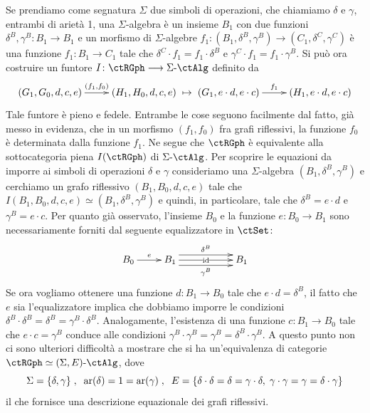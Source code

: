 \begin{example}
 Se prendiamo come segnatura \(\Sigma\) due simboli di operazioni, che chiamiamo \(\delta\) e \(\gamma\), entrambi di arietà 1,
 una \(\Sigma\)-algebra è un insieme \(B_1\) con due funzioni \(\delta^B, \gamma^B \colon B_1 \to B_1\) e un morfismo
 di \(\Sigma\)-algebre \(f_1 \colon (B_1,\delta^B,\gamma^B) \to (C_1,\delta^C,\gamma^C)\) è una funzione \(f_1 \colon B_1 \to C_1\)
 tale che \(\delta^C \cdot f_1 = f_1 \cdot \delta^B\) e \(\gamma^C \cdot f_1 = f_1 \cdot \gamma^B\). Si può ora costruire un
 funtore \(I \colon \ctRGph \fun \ctSAlg\) definito da
 \[\xymatrix{(G_1,G_0,d,c,e) \ar[r]^-{(f_1,f_0)} & (H_1,H_0,d,c,e)} \mapsto
  \xymatrix{(G_1, e \cdot d, e \cdot c) \ar[r]^-{f_1} & (H_1, e \cdot d, e \cdot c)}\]
 Tale funtore è pieno e fedele. Entrambe le cose seguono facilmente dal fatto, già messo in evidenza, che in un morfismo \((f_1,f_0)\)
 fra grafi riflessivi, la funzione \(f_0\) è determinata dalla funzione \(f_1\). Ne segue che \(\ctRGph\) è equivalente alla sottocategoria
 piena \(I(\ctRGph)\) di \(\ctSAlg\). Per scoprire le equazioni da imporre ai simboli di operazioni \(\delta\) e \(\gamma\)
 consideriamo una \(\Sigma\)-algebra \((B_1,\delta^B,\gamma^B)\) e cerchiamo
 un grafo riflessivo \((B_1,B_0,d,c,e)\) tale che \(I(B_1,B_0,d,c,e) \simeq (B_1,\delta^B,\gamma^B)\) e quindi, in particolare, tale che
 \(\delta^B = e \cdot d\) e \(\gamma^B = e \cdot c\). Per quanto già
 osservato, l'insieme \(B_0\) e la funzione \(e \colon B_0 \to B_1\) sono necessariamente forniti dal seguente equalizzatore in \(\ctSet \colon\)
 \[\xymatrix{B_0 \ar[r]^-{e} & B_1 \ar@<1.2ex>[rr]^-{\delta^B} \ar[rr]|-{\id} \ar@<-1.2ex>[rr]_-{\gamma^B} & & B_1}\]
 Se ora vogliamo ottenere una funzione \(d \colon B_1 \to B_0\) tale che \(e \cdot d = \delta^B\), il fatto che \(e\) sia l'equalizzatore implica
 che dobbiamo imporre le condizioni \(\delta^B \cdot \delta^B = \delta^B = \gamma^B \cdot \delta^B\). Analogamente, l'esistenza di una
 funzione \(c \colon B_1 \to B_0\) tale che \(e \cdot c = \gamma^B\) conduce alle condizioni
 \(\gamma^B \cdot \gamma^B = \gamma^B = \delta^B \cdot \gamma^B\). A questo punto non ci sono ulteriori difficoltà a mostrare che si
 ha un'equivalenza di categorie \(\ctRGph \simeq \ctSEAlg\), dove
 \[\Sigma = \{\delta,\gamma\} \;,\;\; \text{ar}(\delta) = 1 = \text{ar}(\gamma) \;,\;\;
  E = \{\delta \cdot \delta = \delta = \gamma \cdot \delta, \; \gamma \cdot \gamma = \gamma = \delta \cdot \gamma\}\]
 il che fornisce una descrizione equazionale dei grafi riflessivi.
\end{example}

